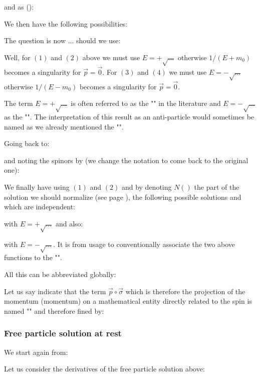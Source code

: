 	and as ():
	
	We then have the following possibilities:
	
	The question is now ... should we use:
 	
	Well, for $(1)$ and $(2)$ above we must use $E=+\sqrt{\ldots}$ otherwise $1/(E+m_0)$ becomes a singularity for $\vec{p}=\vec{0}$. For $(3)$ and $(4)$ we must use $E=-\sqrt{\ldots}$ otherwise $1/(E-m_0)$ becomes a singularity for $\vec{p}=\vec{0}$.
	\begin{tcolorbox}[title=Remark,colframe=black,arc=10pt]
	The term $E=+\sqrt{\ldots}$ is often referred to as the "" in the literature and $E=-\sqrt{\ldots}$ as the "". The interpretation of this result as an anti-particle would sometimes be named as we already mentioned the "".
	\end{tcolorbox}
	Going back to:
	
	and noting the spinors by (we change the notation to come back to the original one):
	
	\label{free particle dirac equation involving factor N} We finally have using $(1)$ and $(2)$ and by denoting $N()$ the part of the solution we should normalize (see page \pageref{normalization dirac free particle solution}), the following possible solutions and which are independent:
	
	
	with $E=+\sqrt{\ldots}$ and also:
	
	
	with $E=-\sqrt{\ldots}$. It is from usage to conventionally associate the two above functions to the "".

	All this can be abbreviated globally:
	
	Let us say indicate that the term $\vec{p}\circ\vec{\sigma}$ which is therefore the projection of the momentum (momentum) on a mathematical entity directly related to the spin is named "" and therefore fined by:
	
	
	\subsubsection{Free particle solution at rest}\label{free particle solution at rest}
	We start again from:
		
	Let us consider the derivatives of the free particle solution above:
	
